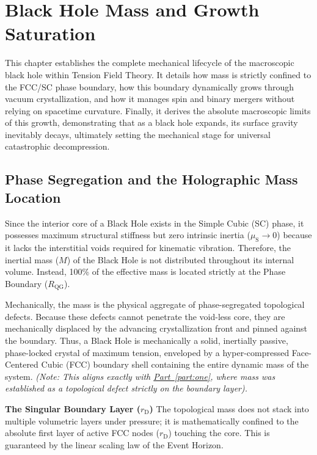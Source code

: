 \chapter{Black Hole Mass and Growth Saturation}
\label{chap:gravitational_saturation}

This chapter establishes the complete mechanical lifecycle of the macroscopic black hole within Tension Field Theory. It details how mass is strictly confined to the FCC/SC phase boundary, how this boundary dynamically grows through vacuum crystallization, and how it manages spin and binary mergers without relying on spacetime curvature. Finally, it derives the absolute macroscopic limits of this growth, demonstrating that as a black hole expands, its surface gravity inevitably decays, ultimately setting the mechanical stage for universal catastrophic decompression.

\section{Phase Segregation and the Holographic Mass Location}

Since the interior core of a Black Hole exists in the Simple Cubic (SC) phase, it possesses maximum structural stiffness but zero intrinsic inertia ($\mu_{\mathrm{S}} \to 0$) because it lacks the interstitial voids required for kinematic vibration. Therefore, the inertial mass ($M$) of the Black Hole is not distributed throughout its internal volume. Instead, 100\% of the effective mass is located strictly at the Phase Boundary ($R_{\mathrm{QG}}$).

Mechanically, the mass is the physical aggregate of phase-segregated topological defects. Because these defects cannot penetrate the void-less core, they are mechanically displaced by the advancing crystallization front and pinned against the boundary. Thus, a Black Hole is mechanically a solid, inertially passive, phase-locked crystal of maximum tension, enveloped by a hyper-compressed Face-Centered Cubic (FCC) boundary shell containing the entire dynamic mass of the system. \textit{(Note: This aligns exactly with \hyperref[part:one]{Part~\ref{part:one}}, where mass was established as a topological defect strictly on the boundary layer).}

\vspace{0.5em}
\noindent\textbf{The Singular Boundary Layer ($r_{\mathrm{D}}$)}
The topological mass does not stack into multiple volumetric layers under pressure; it is mathematically confined to the absolute first layer of active FCC nodes ($r_{\mathrm{D}}$) touching the core. This is guaranteed by the linear scaling law of the Event Horizon.

